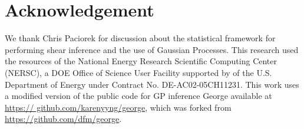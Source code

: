 \section{Acknowledgement}
We thank Chris Paciorek for discussion about the statistical
framework for performing shear inference and the
use of Gaussian Processes.
This research
used the resources of the National Energy Research Scientific 
Computing Center (NERSC), a DOE Office of Science
User Facility supported by 
of the U.S. Department of Energy under Contract No.
DE-AC02-05CH11231.
 This work uses a modified version
of the public code for GP inference {\sc George} available at \href{https://
github.com/karenyyng/george}{https://
github.com/karenyyng/george}, which was forked from \\
\href{https://github.com/dfm/george}{https://github.com/dfm/george}.



